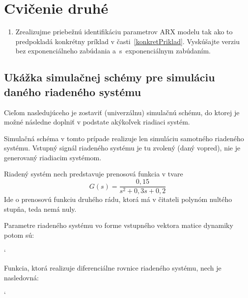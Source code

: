\documentclass[a4paper, 10pt, ]{article}
\begin{document}
\section{Cvičenie druhé}
\label{cvicdruhe}

\begin{enumerate}[leftmargin=0pt, labelsep=4mm, itemsep=0pt]

	\item Zrealizujme priebežnú identifikáciu parametrov ARX modelu tak ako to predpokladá konkrétny príklad v časti~\ref{konkretPriklad}. Vyskúšajte verziu bez exponenciálneho zabúdania a~s~exponenciálnym zabúdaním.

\end{enumerate}






\subsection{Ukážka simulačnej schémy pre simuláciu daného riadeného systému}

Cieľom nasledujúceho je zostaviť (univerzálnu) simulačnú schému, do ktorej je možné následne doplniť v podstate akýkoľvek riadiaci systém.


Simulačná schéma v tomto prípade realizuje len simuláciu samotného riadeného systému. Vstupný signál riadeného systému je tu zvolený (daný vopred), nie je generovaný riadiacim systémom.


Riadený systém nech predstavuje prenosová funkcia v tvare
\begin{equation}
	G(s) = \frac{0,15}{s^2 + 0,3s + 0,2}
\end{equation}
Ide o prenosovú funkciu druhého rádu, ktorá má v čitateli polynóm nultého stupňa, teda nemá nuly.

Parametre riadeného systému vo forme vstupného vektora matice dynamiky potom sú:

{\catcode`

}


\noindent
Funkcia, ktorá realizuje diferenciálne rovnice riadeného systému, nech je nasledovná:

{\catcode`

}
\end{document}
